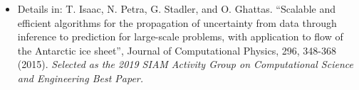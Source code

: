 \documentclass[10pt,final,xcolor=dvipsnames]{beamer}
\begin{document}
\begin{frame}
  \vspace{0.1in}
  \begin{itemize}
  \item [] \scriptsize{Details in: T. Isaac, N. Petra, G. Stadler, and
    O. Ghattas. ``Scalable and efficient algorithms for the
    propagation of uncertainty from data through inference to
    prediction for large-scale problems, with application to flow of
    the Antarctic ice sheet'', Journal of Computational Physics, 296,
    348-368 (2015). {\it Selected as the 2019 SIAM Activity Group on
    Computational Science and Engineering Best Paper.}}
  \end{itemize}


\end{frame}
\end{document}

